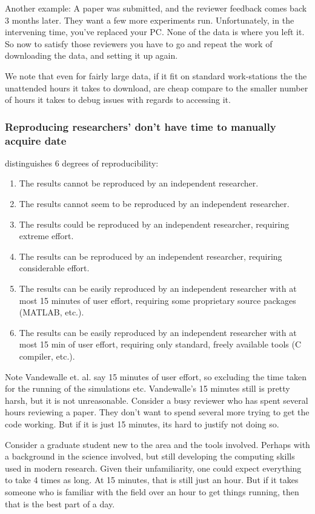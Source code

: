 \documentclass{jors}
\begin{document}
Another example:
A paper was submitted, and the reviewer feedback comes back 3 months later.
They want a few more experiments run.
Unfortunately, in the intervening time, you've replaced your PC.
None of the data is where you left it.
So now to satisfy those reviewers you have to go and repeat the work of downloading the data,
and setting it up again.


We note that even for fairly large data, if it fit on standard work-stations the the unattended hours it takes to download,
are cheap compare to the smaller number of hours it takes to debug issues with regards to accessing it.



\subsubsection{Reproducing researchers' don't have time to manually acquire date}
\textcite{VabdewakkeReproduceableResearch} distinguishes 6 degrees of reproducibility:
\begin{enumerate}
	\addtocounter{enumi}{-1} %
	\item The results cannot be reproduced by an independent researcher.
	\item The results cannot seem to be reproduced by an independent researcher.
	\item The results could be reproduced by an independent researcher, requiring extreme effort. 
	\item The results can be reproduced by an independent researcher, requiring considerable effort.
	\item The results can be easily reproduced by an independent researcher with at most 15 minutes of user effort, requiring some proprietary source packages (MATLAB, etc.).
	\item The results can be easily reproduced by an independent researcher with at most 15 min of user effort, requiring only standard, freely available tools (C compiler, etc.).
\end{enumerate}
Note Vandewalle et. al. say 15 minutes of user effort, so excluding the time taken for the running of the simulations etc.
Vandewalle's 15 minutes still is pretty harsh, but it is not unreasonable.
Consider a busy reviewer who has spent several hours reviewing a paper.
They don't want to spend several more trying to get the code working.
But if it is just 15 minutes, its hard to justify not doing so.

Consider a graduate student new to the area and the tools involved.
Perhaps with a background in the science involved, but still developing the computing skills used in modern research.
Given their unfamiliarity, one could expect everything to take 4 times as long.
At 15 minutes, that is still just an hour.
But if it takes someone who is familiar with the field over an hour to get things running, then that is the best part of a day.
\end{document}
